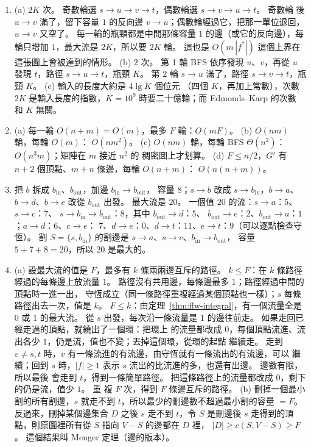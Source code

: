 \begin{enumerate}
\item (a) $2K$ 次。 奇數輪選 $s \to u \to v \to t$，偶數輪選 $s \to v \to u \to t$。 奇數輪
後 $u \to v$ 滿了，留下容量 $1$ 的反向邊 $v \to u$；偶數輪經過它，把那一單位退回，$u \to v$
又空了。 每一輪的瓶頸都是中間那條容量 $1$ 的邊（或它的反向邊），每輪只增加 $1$，最大流是
$2K$，所以要 $2K$ 輪。 這也是 $O(m\,|f^{*}|)$ 這個上界在這張圖上會被達到的情形。 (b) $2$ 次。
第 1 輪 BFS 依序發現 $u$、$v$，再從 $u$ 發現 $t$，路徑 $s \to u \to t$，瓶頸 $K$。 第 2 輪
$s \to u$ 滿了，路徑 $s \to v \to t$，瓶頸 $K$。 (c) 輸入的長度大約是 $4 \lg K$ 個位元
（四個 $K$，再加上常數），次數 $2K$ 是輸入長度的指數，$K = 10^9$ 時要二十億輪；而 Edmonds--Karp 的次數
和 $K$ 無關。

\item (a) 每一輪 $O(n + m) = O(m)$，最多 $F$ 輪：$O(mF)$。 (b) $O(nm)$ 輪，每輪 $O(m)$：
$O(nm^2)$。 (c) $O(nm)$ 輪，每輪 BFS $\Theta(n^2)$：$O(n^3 m)$；矩陣在 $m$ 接近 $n^2$ 的
稠密圖上才划算。 (d) $F \le n/2$，$G'$ 有 $n + 2$ 個頂點、$m + n$ 條邊，每輪 $O(n + m)$：
$O(n(n + m))$。

\item 把 $b$ 拆成 $b_{\mathrm{in}}$、$b_{\mathrm{out}}$，加邊 $b_{\mathrm{in}} \to b_{\mathrm{out}}$，
容量 $8$；$s \to b$ 改成 $s \to b_{\mathrm{in}}$，$b \to a$、$b \to d$、$b \to e$ 改從
$b_{\mathrm{out}}$ 出發。 最大流是 $20$。 一個值 $20$ 的流：$s \to a$：$5$、$s \to c$：$7$、
$s \to b_{\mathrm{in}} \to b_{\mathrm{out}}$：$8$，其中 $b_{\mathrm{out}} \to d$：$5$、
$b_{\mathrm{out}} \to e$：$2$、$b_{\mathrm{out}} \to a$：$1$；$a \to d$：$6$、$c \to e$：
$7$、$d \to e$：$0$、$d \to t$：$11$、$e \to t$：$9$（可以逐點檢查守恆）。 割
$S = \{s, b_{\mathrm{in}}\}$ 的割邊是 $s \to a$、$s \to c$、$b_{\mathrm{in}} \to b_{\mathrm{out}}$，
容量 $5 + 7 + 8 = 20$，所以 $20$ 是最大的。

\item (a) 設最大流的值是 $F$，最多有 $k$ 條兩兩邊互斥的路徑。 \textbf{$k \le F$}：在 $k$ 條路徑
經過的每條邊上放流量 $1$。 路徑沒有共用邊，每條邊最多 $1$；路徑經過中間的頂點時一進一出，
守恆成立（同一條路徑重複經過某個頂點也一樣）；$s$ 每條路徑出去一次，值是 $k$。
\textbf{$F \le k$}：由定理~\ref{thm:flw-integral}，有一個流量全是 $0$ 或 $1$ 的最大流。 從 $s$
出發，每次沿一條流量是 $1$ 的邊往前走。 如果走回已經走過的頂點，就繞出了一個環：把環上
的流量都改成 $0$，每個頂點流進、流出各少 $1$，仍是流，值也不變；丟掉這個環，從環的起點
繼續走。 走到 $v \ne s, t$ 時，$v$ 有一條流進的有流邊，由守恆就有一條流出的有流邊，可以
繼續；回到 $s$ 時，$|f| \ge 1$ 表示 $s$ 流出的比流進的多，也還有出邊。 邊數有限，所以最後
會走到 $t$，得到一條簡單路徑。 把這條路徑上的流量都改成 $0$，剩下的仍是流，值少 $1$。 重
複 $F$ 次，得到 $F$ 條邊互斥的路徑。 (b) 刪掉一個最小割的所有割邊，$s$ 就走不到
$t$，所以最少的刪邊數不超過最小割的容量 $= F$。 反過來，刪掉某個邊集合 $D$ 之後 $s$ 走不到
$t$，令 $S$ 是刪邊後 $s$ 走得到的頂點，則原圖裡所有從 $S$ 指向 $V - S$ 的邊都在 $D$ 裡，
$|D| \ge c(S, V - S) \ge F$。 這個結果叫 Menger 定理（邊的版本）。


\end{enumerate}
